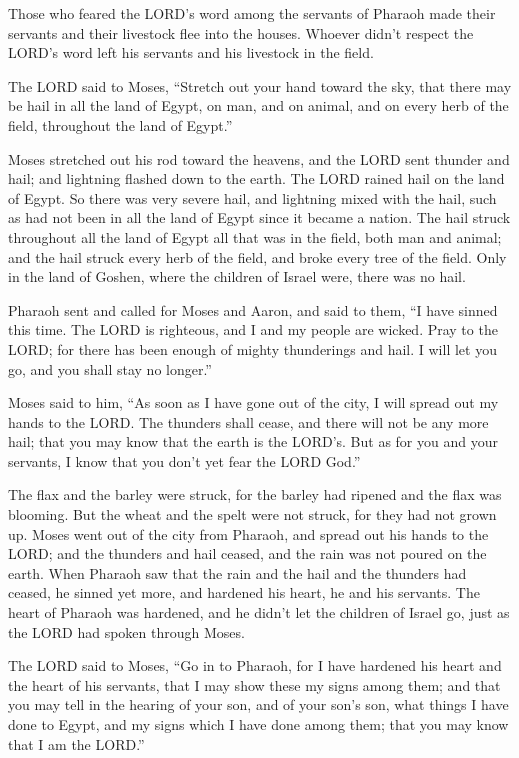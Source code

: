 \myverse{}Those who feared the LORD’s word among the servants of Pharaoh
made their servants and their livestock flee into the houses.
\myverse{}Whoever didn’t respect the LORD’s word left his servants and his livestock
in the field.


\myverse{}The LORD said to Moses, “Stretch out your hand toward the sky,
that there may be hail in all the land of Egypt, on man, and on animal, and on every herb of the field,
throughout the land of Egypt.”


\myverse{}Moses stretched out his rod toward the heavens, and the LORD
sent thunder and hail; and lightning flashed down to the earth. The LORD rained hail on the land of Egypt.
\myverse{}So there was very severe hail, and lightning mixed with the hail, such as
had not been in all the land of Egypt since it became a nation.
\myverse{}The hail struck throughout all the land of Egypt all that was in the field,
both man and animal; and the hail struck every herb of the field, and broke every tree of the field.
\myverse{}Only in the land of Goshen, where the children of Israel were, there was no
hail.


\myverse{}Pharaoh sent and called for Moses and Aaron, and said to them,
“I have sinned this time. The LORD is righteous, and I and my people are wicked.
\myverse{}Pray to the LORD; for there has been enough of mighty thunderings and hail.
I will let you go, and you shall stay no longer.”


\myverse{}Moses said to him, “As soon as I have gone out of the city, I
will spread out my hands to the LORD. The thunders shall cease, and there will not be any more hail; that
you may know that the earth is the LORD’s.
\myverse{}But as for you and your servants, I know that you don’t yet fear the LORD
God.”


\myverse{}The flax and the barley were struck, for the barley had ripened
and the flax was blooming.
\myverse{}But the wheat and the spelt were not struck, for they had not grown up.
\myverse{}Moses went out of the city from Pharaoh, and spread out his hands to the LORD;
and the thunders and hail ceased, and the rain was not poured on the earth.
\myverse{}When Pharaoh saw that the rain and the hail and the thunders had ceased, he
sinned yet more, and hardened his heart, he and his servants.
\myverse{}The heart of Pharaoh was hardened, and he didn’t let the children of Israel
go, just as the LORD had spoken through Moses.


\mychapter{} \myverse*{}The LORD said to Moses, “Go in to Pharaoh, for I have hardened his heart and the heart of his servants, that I may show these my signs among them;
\myverse{}and that you may tell in the hearing of your son, and of your son’s son, what
things I have done to Egypt, and my signs which I have done among them; that you may know that I am the
LORD.”


